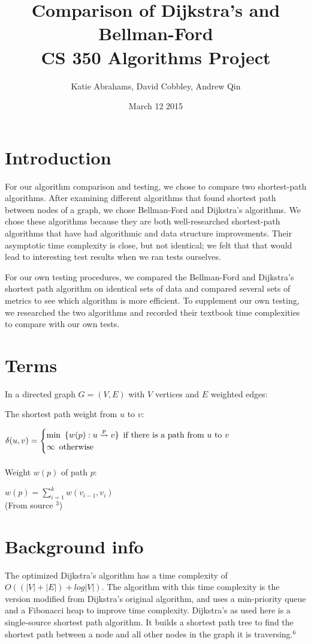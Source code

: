 \documentclass{article}
\title{Comparison of Dijkstra's and Bellman-Ford \\ CS 350 Algorithms Project}
\author{Katie Abrahams, David Cobbley, Andrew Qin}
\date{March 12 2015}
\begin{document}
\maketitle

\tableofcontents

\pagebreak

\section{Introduction}
For our algorithm comparison and testing, we chose to compare two shortest-path algorithms.  After examining different algorithms that found shortest path between nodes of a graph, we chose Bellman-Ford and Dijkstra's algorithms.  We chose these algorithms because they are both well-researched shortest-path algorithms that have had algorithmic and data structure improvements.  Their asymptotic time complexity is close, but not identical; we felt that that would lead to interesting test results when we ran tests ourselves.

For our own testing procedures, we compared the Bellman-Ford and Dijkstra's shortest path algorithm on identical sets of data and compared several sets of metrics to see which algorithm is more efficient.  To supplement our own testing, we researched the two algorithms and recorded their textbook time complexities to compare with our own tests.
\section{Terms}
In a directed graph $G=(V,E)$ with $V$ vertices and $E$ weighted edges:

The shortest path weight from $u$ to $v$:

$\delta(u,v) = \begin{cases}
\text{min} \hspace{5 pt} \{w(p):u\overset{p}{\leadsto}v\} \hspace{5 pt} \text{if there is a path from $u$ to $v$}\\
\infty \hspace{5 pt} \text{otherwise}
\end{cases}$
\\
\\
Weight $w(p)$ of path $p$:

$w(p)=\displaystyle\sum_{i=1}^{k} w(v_{i-1},v_{i})$
\\
(From source $^3$)
\section{Background info}
The optimized Dijkstra's algorithm has a time complexity of $O((|V|+|E|)+log|V|)$.
The algorithm with this time complexity is the version modified from Dijkstra's original algorithm, and uses a min-priority queue and a Fibonacci heap to improve time complexity.  Dijkstra's as used here is a single-source shortest path algorithm.  It builds a shortest path tree to find the shortest path between a node and all other nodes in the graph it is traversing.$^6$
\end{document}
